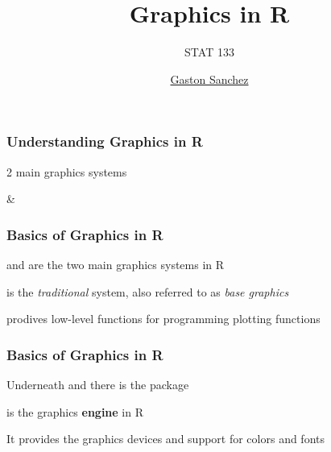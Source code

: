 \documentclass[12pt]{beamer}\usepackage[]{graphicx}\usepackage[]{color}
\title{Graphics in R}
\subtitle{STAT 133}
\author{\href{http://www.gastonsanchez.com}{Gaston Sanchez}}
\institute{\href{https://github.com/ucb-stat133/stat133-fall-2016}{\tt \scriptsize \color{foreground} github.com/ucb-stat133/stat133-fall-2016}}
\date{}
\begin{document}
{
  \frame{
    \titlepage
  } 
}


\begin{frame}
\begin{center}
\Huge{}
\end{center}
\end{frame}


\begin{frame}
\frametitle{Understanding Graphics in R}

\centerline{\mdlit \Large 2 main graphics systems}

\bigskip
\centerline{\Large {} \quad \& \quad {}}

\end{frame}


\begin{frame}
\frametitle{Basics of Graphics in R}

\bbi
  \item {} and  are the two main graphics systems in R
  \item {} is the \textit{traditional} system, also referred to as \textit{base graphics}
  \item {} prodives low-level functions for programming plotting functions
\ei
\eb

\end{frame}


\begin{frame}
\frametitle{Basics of Graphics in R}

\bbi
  \item Underneath  and  there is the package 
  \item {} is the graphics \textbf{engine} in R
  \item It provides the graphics devices and support for colors and fonts
\ei
\eb

\end{frame}

\end{document}
